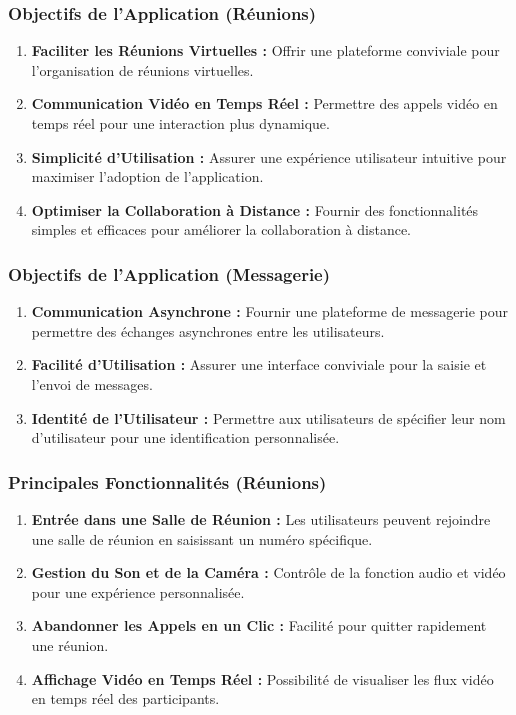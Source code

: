\documentclass[12pt, a4paper, oneside]{thesis}
\begin{document}
\subsubsection{Objectifs de l'Application (Réunions)}
\begin{enumerate}
    \item \textbf{Faciliter les Réunions Virtuelles :} Offrir une plateforme conviviale pour l'organisation de réunions virtuelles.
    \item \textbf{Communication Vidéo en Temps Réel :} Permettre des appels vidéo en temps réel pour une interaction plus dynamique.
    \item \textbf{Simplicité d'Utilisation :} Assurer une expérience utilisateur intuitive pour maximiser l'adoption de l'application.
    \item \textbf{Optimiser la Collaboration à Distance :} Fournir des fonctionnalités simples et efficaces pour améliorer la collaboration à distance.
\end{enumerate}

\subsubsection{Objectifs de l'Application (Messagerie)}
\begin{enumerate}
    \item \textbf{Communication Asynchrone :} Fournir une plateforme de messagerie pour permettre des échanges asynchrones entre les utilisateurs.
    \item \textbf{Facilité d'Utilisation :} Assurer une interface conviviale pour la saisie et l'envoi de messages.
    \item \textbf{Identité de l'Utilisateur :} Permettre aux utilisateurs de spécifier leur nom d'utilisateur pour une identification personnalisée.
\end{enumerate}

\subsubsection{Principales Fonctionnalités (Réunions)}
\begin{enumerate}
    \item \textbf{Entrée dans une Salle de Réunion :} Les utilisateurs peuvent rejoindre une salle de réunion en saisissant un numéro spécifique.
    \item \textbf{Gestion du Son et de la Caméra :} Contrôle de la fonction audio et vidéo pour une expérience personnalisée.
    \item \textbf{Abandonner les Appels en un Clic :} Facilité pour quitter rapidement une réunion.
    \item \textbf{Affichage Vidéo en Temps Réel :} Possibilité de visualiser les flux vidéo en temps réel des participants.
\end{enumerate}
\end{document}
